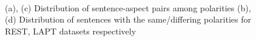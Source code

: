 \documentclass[comsoc,conference]{IEEEtran}
\begin{document}
\begin{figure}[!htb]
    \centering
    \hfill
    \\
    \hfill
  \caption{(a), (c) Distribution of sentence-aspect pairs among polarities (b), (d) Distribution of sentences with the same/differing polarities for REST, LAPT datasets respectively}
  \label{P1} 
\end{figure}
\end{document}
